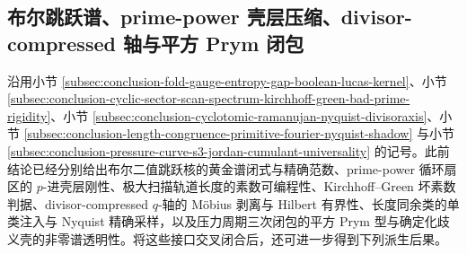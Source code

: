 \subsection{布尔跳跃谱、prime-power 壳层压缩、divisor-compressed 轴与平方 Prym 闭包}\label{subsec:conclusion-boolean-primepower-divisoraxis-prym-closure}
沿用小节 \ref{subsec:conclusion-fold-gauge-entropy-gap-boolean-lucas-kernel}、小节 \ref{subsec:conclusion-cyclic-sector-scan-spectrum-kirchhoff-green-bad-prime-rigidity}、小节 \ref{subsec:conclusion-cyclotomic-ramanujan-nyquist-divisoraxis}、小节 \ref{subsec:conclusion-length-congruence-primitive-fourier-nyquist-shadow} 与小节 \ref{subsec:conclusion-pressure-curve-s3-jordan-cumulant-universality} 的记号。此前结论已经分别给出布尔二值跳跃核的黄金谱闭式与精确范数、prime-power 循环扇区的 \(p\)-进壳层刚性、极大扫描轨道长度的素数可编程性、Kirchhoff--Green 坏素数判据、divisor-compressed \(q\)-轴的 Möbius 剥离与 Hilbert 有界性、长度同余类的单类注入与 Nyquist 精确采样，以及压力周期三次闭包的平方 Prym 型与确定化歧义壳的非零谱透明性。将这些接口交叉闭合后，还可进一步得到下列派生后果。

